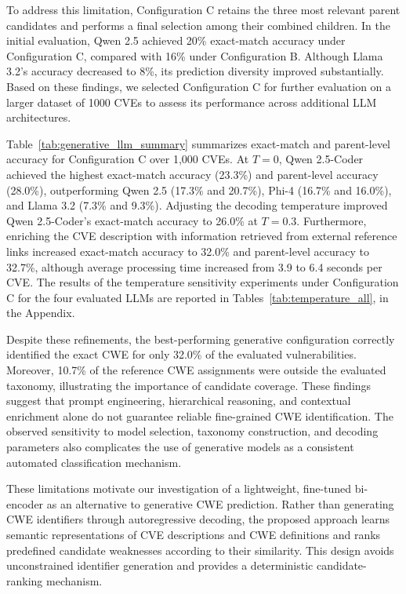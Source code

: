 \documentclass[conference,compsoc]{IEEEtran}
\begin{document}
To address this limitation, Configuration C retains
the three most relevant parent candidates and performs
a final selection among their combined children.
In the initial evaluation, Qwen 2.5 achieved 20\%
exact-match accuracy under Configuration C, compared
with 16\% under Configuration B. Although Llama 3.2's
accuracy decreased to 8\%, its prediction diversity
improved substantially. Based on these findings,
we selected Configuration C for further evaluation
on a larger dataset of 1000 CVEs to assess its
performance across additional LLM architectures.


Table~\ref{tab:generative_llm_summary} summarizes exact-match and parent-level accuracy for Configuration C over 1,000 CVEs. At $T=0$, Qwen 2.5-Coder
achieved the highest exact-match accuracy (23.3\%)
and parent-level accuracy (28.0\%), outperforming
Qwen 2.5 (17.3\% and 20.7\%), Phi-4 (16.7\%
and 16.0\%), and Llama 3.2 (7.3\% and 9.3\%).
Adjusting the decoding temperature improved
Qwen 2.5-Coder's exact-match accuracy to 26.0\%
at $T=0.3$. Furthermore, enriching the CVE
description with information retrieved from
external reference links increased exact-match
accuracy to 32.0\% and parent-level accuracy
to 32.7\%, although average processing time
increased from 3.9 to 6.4 seconds per CVE.
The results of the temperature sensitivity experiments
under Configuration C for the four evaluated LLMs are
reported in Tables~\ref{tab:temperature_all}, in the Appendix.

Despite these refinements, the best-performing
generative configuration correctly identified
the exact CWE for only 32.0\% of the evaluated
vulnerabilities. Moreover, 10.7\% of the
reference CWE assignments were outside the
evaluated taxonomy, illustrating the importance
of candidate coverage. These findings suggest
that prompt engineering, hierarchical reasoning,
and contextual enrichment alone do not guarantee
reliable fine-grained CWE identification.
The observed sensitivity to model selection,
taxonomy construction, and decoding parameters
also complicates the use of generative models
as a consistent automated classification mechanism.

These limitations motivate our investigation of
a lightweight, fine-tuned bi-encoder as an
alternative to generative CWE prediction.
Rather than generating CWE identifiers through
autoregressive decoding, the proposed approach
learns semantic representations of CVE descriptions
and CWE definitions and ranks predefined candidate
weaknesses according to their similarity.
This design avoids unconstrained identifier
generation and provides a deterministic
candidate-ranking mechanism.
\end{document}
